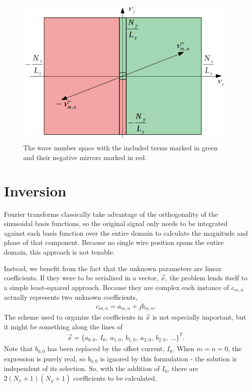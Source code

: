 \documentclass{article}
\begin{document}
\begin{figure}
\centering
\includegraphics[width=0.9\linewidth]{figures/wavenumbers}
\caption{The wave number space with the included terms marked in green and their negative mirrors marked in red.}\label{fig:wavenumbers}
\end{figure}

\section{Inversion}

Fourier transforms classically take advantage of the orthogonality of the sinusoidal basis functions, so the original signal only needs to be integrated against each basis function over the entire domain to calculate the magnitude and phase of that component.  Because no single wire position spans the entire domain, this approach is not tenable.

Instead, we benefit from the fact that the unknown parameters are linear coefficients.  If they were to be serialized in a vector, $\vec{x}$, the problem lends itself to a simple least-squared approach.  Because they are complex each instance of $c_{m,n}$ actually represents two unknown coefficients,
\begin{align}
c_{m,n} = a_{m,n} + j b_{m,n}.
\end{align}
The scheme used to organize the coefficients in $\vec{x}$ is not especially important, but it might be something along the lines of 
\begin{align}
\vec{x} = \{a_{0,0},\ I_0,\ a_{1,0},\ b_{1,0},\ a_{2,0},\ b_{2,0},\ \ldots \}^T.
\end{align}
Note that $b_{0,0}$ has been replaced by the offset current, $I_0$.  When $m=n=0$, the expression is purely real, so $b_{0,0}$ is ignored by this formulation - the solution is independent of its selection.  So, with the addition of $I_0$, there are $2(N_x+1)(N_y+1)$ coefficients to be calculated.
\end{document}
